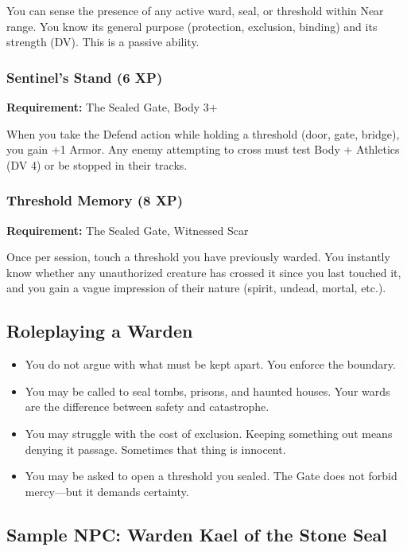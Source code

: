 You can sense the presence of any active ward, seal, or threshold within Near range. You know its general purpose (protection, exclusion, binding) and its strength (DV). This is a passive ability.

\subsubsection{Sentinel's Stand (6 XP)}

\textbf{Requirement:} The Sealed Gate, Body 3+

When you take the Defend action while holding a threshold (door, gate, bridge), you gain +1 Armor. Any enemy attempting to cross must test Body + Athletics (DV 4) or be stopped in their tracks.

\subsubsection{Threshold Memory (8 XP)}

\textbf{Requirement:} The Sealed Gate, Witnessed Scar

Once per session, touch a threshold you have previously warded. You instantly know whether any unauthorized creature has crossed it since you last touched it, and you gain a vague impression of their nature (spirit, undead, mortal, etc.).

\subsection{Roleplaying a Warden}

\begin{itemize}
\item You do not argue with what must be kept apart. You enforce the boundary.
\item You may be called to seal tombs, prisons, and haunted houses. Your wards are the difference between safety and catastrophe.
\item You may struggle with the cost of exclusion. Keeping something out means denying it passage. Sometimes that thing is innocent.
\item You may be asked to open a threshold you sealed. The Gate does not forbid mercy—but it demands certainty.
\end{itemize}

\subsection{Sample NPC: Warden Kael of the Stone Seal}


